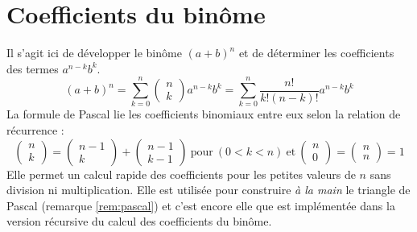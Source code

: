 \section*{Coefficients du binôme}
Il s'agit ici de développer le binôme $(a+b)^n$ et de déterminer les coefficients
des termes $a^{n-k}b^k$.
$$(a+b)^n = 
\sum_{k=0}^n \left(\begin{array}{c}n\\k\end{array}\right) a^{n-k}b^k =
\sum_{k=0}^n \frac{n!}{k!(n-k)!}a^{n-k}b^k$$
La formule de Pascal lie les coefficients binomiaux entre eux selon la relation de
récurrence :
$$\left(\begin{array}{c}n\\k\end{array}\right) =
\left(\begin{array}{c}n-1\\k\end{array}\right) +
\left(\begin{array}{c}n-1\\k-1\end{array}\right)
\ \mbox{pour}\ (0 < k < n)\ \mbox{et}\ 
\left(\begin{array}{c}n\\0\end{array}\right) = 
\left(\begin{array}{c}n\\n\end{array}\right) = 1$$
Elle permet un calcul rapide des coefficients pour les petites valeurs de $n$ 
sans division ni multiplication. Elle est utilisée pour construire 
{\em à la main} le triangle de Pascal (remarque \ref{rem:pascal})
et c'est encore elle que est implémentée dans la version récursive 
du calcul des coefficients du binôme.

